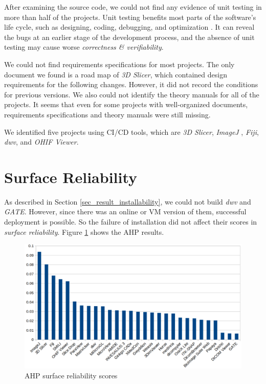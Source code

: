 After examining the source code, we could not find any evidence of unit testing in more than half of the projects. Unit testing benefits most parts of the software's life cycle, such as designing, coding, debugging, and optimization \cite{Hamill2004}. It can reveal the bugs at an earlier stage of the development process, and the absence of unit testing may cause worse \textit{correctness \& verifiability}.

We could not find requirements specifications for most projects. The only document we found is a road map of \textit{3D Slicer}, which contained design requirements for the following changes. However, it did not record the conditions for previous versions. We also could not identify the theory manuals for all of the projects. It seems that even for some projects with well-organized documents, requirements specifications and theory manuals were still missing.

We identified five projects using CI/CD tools, which are \textit{3D Slicer}, \textit{ImageJ
}, \textit{Fiji}, \textit{dwv}, and \textit{OHIF Viewer}.

\section{Surface Reliability}
As described in Section \ref{sec_result_installability}, we could not build \textit{dwv} and \textit{GATE}. However, since there was an online or VM version of them, successful deployment is possible. So the failure of installation did not affect their scores in \textit{surface reliability}. Figure \ref{fg_reliability_scores} shows the AHP results.

\begin{figure}[H]
\includegraphics[scale=0.38]{figures/reliability_scores.png}
\caption{AHP surface reliability scores}
\label{fg_reliability_scores}
\end{figure}

